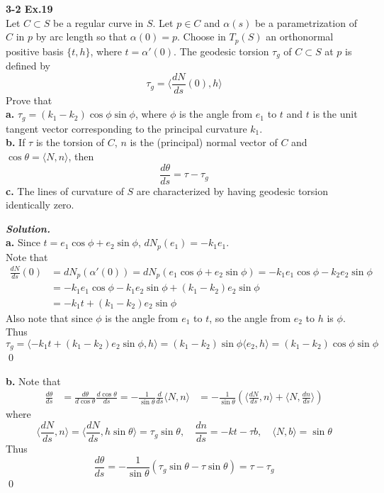 \documentclass{article}
\begin{document}
\par
\textbf{3-2 Ex.19}\\
Let $C \subset S$ be a regular curve in $S$. Let $p \in C$
and $\alpha(s)$ be a parametrization of $C$ in $p$ by arc
length so that $\alpha(0) = p$. Choose in $T_p(S)$ an
orthonormal positive basis $\{t,h\}$, where $t = \alpha'(0)$.
The geodesic torsion $\tau_g$ of $C \subset S$ at $p$ is
defined by
$$
    \tau_g = \langle \frac{dN}{ds}(0), h\rangle
$$
Prove that\\
\textbf{a. }$\tau_g = (k_1 - k_2)\cos \phi \sin \phi$, where
$\phi$ is the angle from $e_1$ to $t$ and $t$ is the unit 
tangent vector corresponding to the principal curvature $k_1$.\\
\textbf{b. }If $\tau$ is the torsion of $C$, $n$ is the
(principal) normal vector of $C$ and $\cos \theta = \langle N, n \rangle$,
then
$$
    \frac{d\theta}{ds} = \tau - \tau_g
$$
\textbf{c. }The lines of curvature of $S$ are characterized
by having geodesic torsion identically zero.

\par
\textbf{\textit{Solution.}}\\
\textbf{a. }
Since $t = e_1 \cos \phi + e_2 \sin \phi$, $dN_p(e_1) = -k_1e_1$.\\
Note that
$$
\begin{aligned}
    \frac{dN}{ds}(0) &= dN_p(\alpha'(0)) = dN_p(e_1 \cos \phi + e_2 \sin \phi)
    = -k_1e_1 \cos \phi -k_2e_2 \sin \phi\\
    &= -k_1e_1 \cos \phi -k_1e_2 \sin \phi + (k_1 - k_2)e_2 \sin \phi\\
    &= -k_1t + (k_1-k_2)e_2 \sin \phi
\end{aligned}
$$
Also note that since $\phi$ is the angle from $e_1$ to $t$, so the angle from
$e_2$ to $h$ is $\phi$.
Thus
$$
    \tau_g = \langle -k_1t + (k_1-k_2)e_2 \sin \phi , h\rangle = (k_1-k_2) \sin \phi \langle e_2, h \rangle = (k_1-k_2) \cos \phi \sin \phi
$$
\qed

\par
\textbf{b. }
Note that
$$
\begin{aligned}
    \frac{d\theta}{ds} &= \frac{d\theta}{d\cos \theta}\frac{d\cos \theta}{ds} = - \frac{1}{\sin \theta} \frac{d}{ds}\langle N, n \rangle
    &= -\frac{1}{\sin \theta}(\langle \frac{dN}{ds}, n\rangle + \langle N, \frac{dn}{ds}\rangle)
\end{aligned}
$$
where
$$
\langle \frac{dN}{ds}, n \rangle = \langle \frac{dN}{ds}, h\sin \theta\rangle = \tau_g \sin \theta,\quad \frac{dn}{ds} = -kt - \tau b, \quad \langle N,b \rangle = \sin \theta
$$ 
Thus
$$
\frac{d\theta}{ds} = - \frac{1}{\sin \theta}(\tau_g \sin \theta - \tau \sin \theta)
=\tau - \tau_g
$$
\qed
\end{document}
